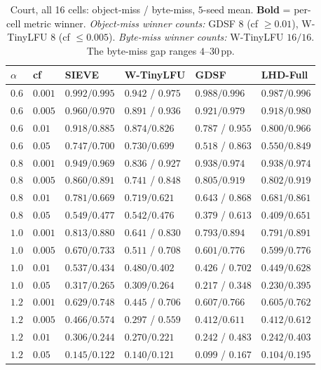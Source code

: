 \documentclass[letterpaper,twocolumn,10pt]{article}
\begin{document}
\begin{table}[t]
\centering
\footnotesize
\renewcommand{\arraystretch}{0.95}
\begin{tabularx}{\textwidth}{@{}llXXXX@{}}
\toprule
$\alpha$ & cf & SIEVE & W-TinyLFU & GDSF & LHD-Full \\
\midrule
$0.6$ & $0.001$ & $0.992 / 0.995$ & $\mathbf{0.942}$ / $\mathbf{0.975}$ & $0.988 / 0.996$ & $0.987 / 0.996$ \\
$0.6$ & $0.005$ & $0.960 / 0.970$ & $\mathbf{0.891}$ / $\mathbf{0.936}$ & $0.921 / 0.979$ & $0.918 / 0.980$ \\
$0.6$ & $0.01$  & $0.918 / 0.885$ & $0.874 / \mathbf{0.826}$            & $\mathbf{0.787}$ / $0.955$ & $0.800 / 0.966$ \\
$0.6$ & $0.05$  & $0.747 / 0.700$ & $0.730 / \mathbf{0.699}$            & $\mathbf{0.518}$ / $0.863$ & $0.550 / 0.849$ \\
$0.8$ & $0.001$ & $0.949 / 0.969$ & $\mathbf{0.836}$ / $\mathbf{0.927}$ & $0.938 / 0.974$ & $0.938 / 0.974$ \\
$0.8$ & $0.005$ & $0.860 / 0.891$ & $\mathbf{0.741}$ / $\mathbf{0.848}$ & $0.805 / 0.919$ & $0.802 / 0.919$ \\
$0.8$ & $0.01$  & $0.781 / 0.669$ & $0.719 / \mathbf{0.621}$            & $\mathbf{0.643}$ / $0.868$ & $0.681 / 0.861$ \\
$0.8$ & $0.05$  & $0.549 / 0.477$ & $0.542 / \mathbf{0.476}$            & $\mathbf{0.379}$ / $0.613$ & $0.409 / 0.651$ \\
$1.0$ & $0.001$ & $0.813 / 0.880$ & $\mathbf{0.641}$ / $\mathbf{0.830}$ & $0.793 / 0.894$ & $0.791 / 0.891$ \\
$1.0$ & $0.005$ & $0.670 / 0.733$ & $\mathbf{0.511}$ / $\mathbf{0.708}$ & $0.601 / 0.776$ & $0.599 / 0.776$ \\
$1.0$ & $0.01$  & $0.537 / 0.434$ & $0.480 / \mathbf{0.402}$            & $\mathbf{0.426}$ / $0.702$ & $0.449 / 0.628$ \\
$1.0$ & $0.05$  & $0.317 / 0.265$ & $0.309 / \mathbf{0.264}$            & $\mathbf{0.217}$ / $0.348$ & $0.230 / 0.395$ \\
$1.2$ & $0.001$ & $0.629 / 0.748$ & $\mathbf{0.445}$ / $\mathbf{0.706}$ & $0.607 / 0.766$ & $0.605 / 0.762$ \\
$1.2$ & $0.005$ & $0.466 / 0.574$ & $\mathbf{0.297}$ / $\mathbf{0.559}$ & $0.412 / 0.611$ & $0.412 / 0.612$ \\
$1.2$ & $0.01$  & $0.306 / 0.244$ & $0.270 / \mathbf{0.221}$            & $\mathbf{0.242}$ / $0.483$ & $0.242 / 0.403$ \\
$1.2$ & $0.05$  & $0.145 / 0.122$ & $0.140 / \mathbf{0.121}$            & $\mathbf{0.099}$ / $0.167$ & $0.104 / 0.195$ \\
\bottomrule
\end{tabularx}
\caption{Court, all 16 cells: object-miss / byte-miss, $5$-seed mean.
\textbf{Bold} = per-cell metric winner. \emph{Object-miss winner counts:}
GDSF $8$ (cf $\geq 0.01$), W-TinyLFU $8$ (cf $\leq 0.005$). \emph{Byte-miss
winner counts:} W-TinyLFU $16/16$. The byte-miss gap ranges $4$--$30$\,pp.}
\label{tab:focal-court}
\end{table}
\end{document}

